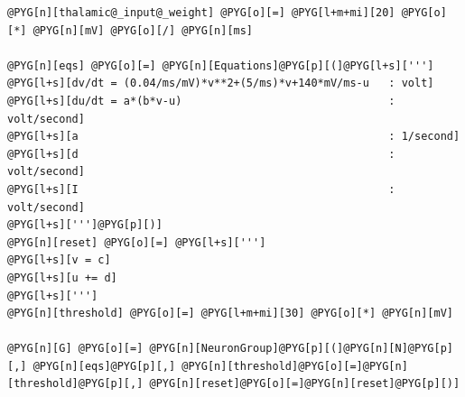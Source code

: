 \documentclass[letterpaper,10pt,english]{manual}
\begin{document}
\begin{Verbatim}[commandchars=@\[\]]
@PYG[n][thalamic@_input@_weight] @PYG[o][=] @PYG[l+m+mi][20] @PYG[o][*] @PYG[n][mV] @PYG[o][/] @PYG[n][ms]

@PYG[n][eqs] @PYG[o][=] @PYG[n][Equations]@PYG[p][(]@PYG[l+s][''']
@PYG[l+s][dv/dt = (0.04/ms/mV)*v**2+(5/ms)*v+140*mV/ms-u   : volt]
@PYG[l+s][du/dt = a*(b*v-u)                                : volt/second]
@PYG[l+s][a                                                : 1/second]
@PYG[l+s][d                                                : volt/second]
@PYG[l+s][I                                                : volt/second]
@PYG[l+s][''']@PYG[p][)]
@PYG[n][reset] @PYG[o][=] @PYG[l+s][''']
@PYG[l+s][v = c]
@PYG[l+s][u += d]
@PYG[l+s][''']
@PYG[n][threshold] @PYG[o][=] @PYG[l+m+mi][30] @PYG[o][*] @PYG[n][mV]

@PYG[n][G] @PYG[o][=] @PYG[n][NeuronGroup]@PYG[p][(]@PYG[n][N]@PYG[p][,] @PYG[n][eqs]@PYG[p][,] @PYG[n][threshold]@PYG[o][=]@PYG[n][threshold]@PYG[p][,] @PYG[n][reset]@PYG[o][=]@PYG[n][reset]@PYG[p][)]


\end{Verbatim}
\end{document}
